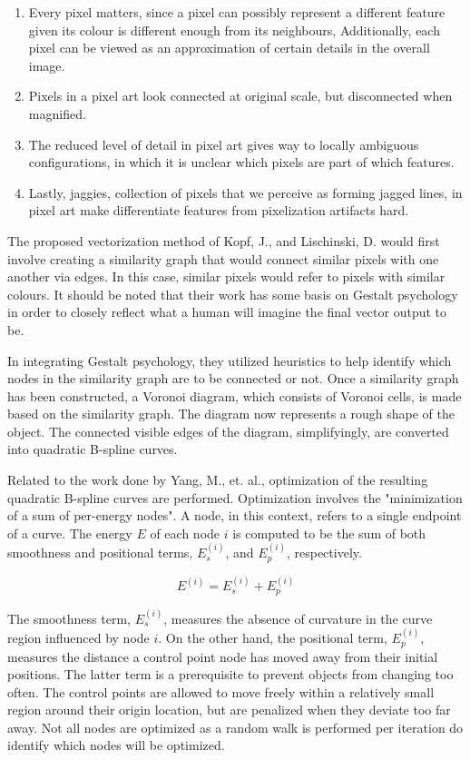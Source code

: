 \begin{enumerate}
    \item Every pixel matters, since a pixel can possibly represent a different feature given its colour is different enough from its neighbours, Additionally, each pixel can be viewed as an approximation of certain details in the overall image.

    \item Pixels in a pixel art look connected at original scale, but disconnected when magnified.

    \item The reduced level of detail in pixel art gives way to locally ambiguous configurations, in which it is unclear which pixels are part of which features.

    \item Lastly, jaggies, collection of pixels that we perceive as forming jagged lines, in pixel art make differentiate features from pixelization artifacts hard.
\end{enumerate}

The proposed vectorization method of Kopf, J., and Lischinski, D. would first involve creating a similarity graph that would connect similar pixels with one another via edges. In this case, similar pixels would refer to pixels with similar colours. It should be noted that their work has some basis on Gestalt psychology in order to closely reflect what a human will imagine the final vector output to be.

In integrating Gestalt psychology, they utilized heuristics to help identify which nodes in the similarity graph are to be connected or not. Once a similarity graph has been constructed, a Voronoi diagram, which consists of Voronoi cells, is made based on the similarity graph. The diagram now represents a rough shape of the object. The connected visible edges of the diagram, simplifyingly, are converted into quadratic B-spline curves.

Related to the work done by Yang, M., et. al., optimization of the resulting quadratic B-spline curves are performed. Optimization involves the "minimization of a sum of per-energy nodes". A node, in this context, refers to a single endpoint of a curve. The energy $E$ of each node $i$ is computed to be the sum of both smoothness and positional terms, $E_{s}^{(i)}$, and $E_{p}^{(i)}$, respectively.

$$ E^{(i)} = E_{s}^{(i)} + E_{p}^{(i)} $$

The smoothness term, $E_{s}^{(i)}$, measures the absence of curvature in the curve region influenced by node $i$. On the other hand, the positional term, $E_{p}^{(i)}$, measures the distance a control point node has moved away from their initial positions. The latter term is a prerequisite to prevent objects from changing too often. The control points are allowed to move freely within a relatively small region around their origin location, but are penalized when they deviate too far away. Not all nodes are optimized as a random walk is performed per iteration do identify which nodes will be optimized.

